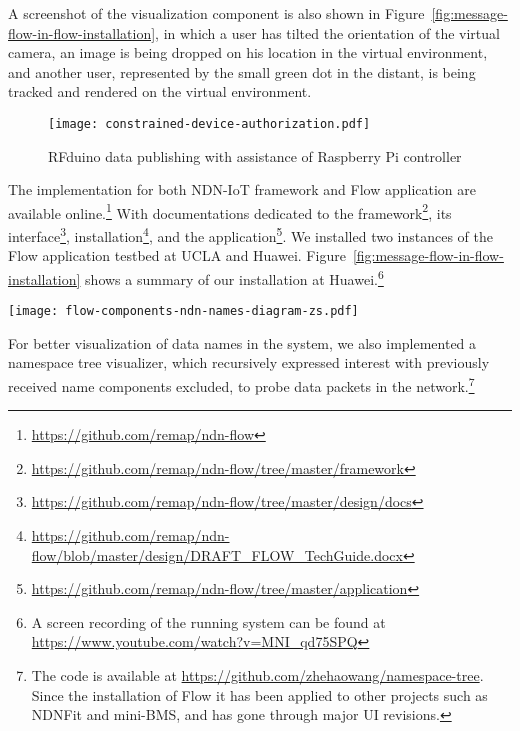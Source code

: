 \begin{enumerate}
A screenshot of the visualization component is also shown in Figure~\ref{fig:message-flow-in-flow-installation}, in which a user has tilted the orientation of the virtual camera, an image is being dropped on his location in the virtual environment, and another user, represented by the small green dot in the distant, is being tracked and rendered on the virtual environment.
\end{enumerate}

\begin{figure}[!t]
\centering
\texttt{[image: constrained-device-authorization.pdf]}
\caption{RFduino data publishing with assistance of Raspberry Pi controller}
\label{fig:contrained-devices-bootstrap}
\end{figure}

The implementation for both NDN-IoT framework and Flow application are available online.\footnote{\url{https://github.com/remap/ndn-flow}} 
With documentations dedicated to the framework\footnote{\url{https://github.com/remap/ndn-flow/tree/master/framework}}, its interface\footnote{\url{https://github.com/remap/ndn-flow/tree/master/design/docs}}, installation\footnote{\url{https://github.com/remap/ndn-flow/blob/master/design/DRAFT_FLOW_TechGuide.docx}}, and the application\footnote{\url{https://github.com/remap/ndn-flow/tree/master/application}}.
We installed two instances of the Flow application testbed at UCLA and Huawei. 
Figure~\ref{fig:message-flow-in-flow-installation} shows a summary of our installation at Huawei.\footnote{A screen recording of the running system can be found at \url{https://www.youtube.com/watch?v=MNI_qd75SPQ}}

\begin{figure*}[!t]
\centering
\texttt{[image: flow-components-ndn-names-diagram-zs.pdf]}
\caption{Application components and message flows in Flow}
\label{fig:message-flow-in-flow-installation}
\end{figure*}

For better visualization of data names in the system, we also implemented a namespace tree visualizer, which recursively expressed interest with previously received name components excluded, to probe data packets in the network.\footnote{The code is available at \url{https://github.com/zhehaowang/namespace-tree}. Since the installation of Flow it has been applied to other projects such as NDNFit and mini-BMS, and has gone through major UI revisions.}

